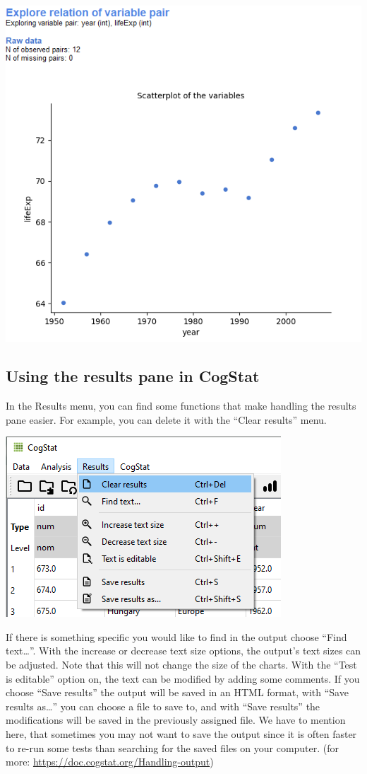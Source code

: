 \documentclass[
]{book}
\begin{document}
\includegraphics{img/ch1/variablepairplot.png}

\hypertarget{using-the-results-pane-in-cogstat}{%
\subsection{Using the results pane in CogStat}\label{using-the-results-pane-in-cogstat}}

In the Results menu, you can find some functions that make handling the results pane easier. For example, you can delete it with the ``Clear results'' menu.

\includegraphics{img/ch1/menu_clearresults.png}

If there is something specific you would like to find in the output choose ``Find text\ldots{}''. With the increase or decrease text size options, the output's text sizes can be adjusted. Note that this will not change the size of the charts. With the ``Test is editable'' option on, the text can be modified by adding some comments. If you choose ``Save results'' the output will be saved in an HTML format, with ``Save results as\ldots{}'' you can choose a file to save to, and with ``Save results'' the modifications will be saved in the previously assigned file. We have to mention here, that sometimes you may not want to save the output since it is often faster to re-run some tests than searching for the saved files on your computer.
(for more: \url{https://doc.cogstat.org/Handling-output})
\end{document}

